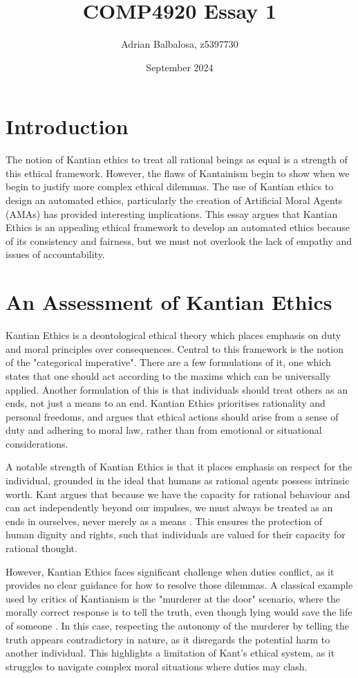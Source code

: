\documentclass{article}
\title{COMP4920 Essay 1}
\author{Adrian Balbalosa, z5397730}
\date{September 2024}
\begin{document}
\maketitle

\section{Introduction}
The notion of Kantian ethics to treat all rational beings as
equal is a strength of this ethical framework. However, the flaws of Kantainism 
begin to show when we begin to justify more complex ethical dilemmas. The 
use of Kantian ethics to design an automated ethics, particularly the creation of
Artificial Moral Agents (AMAs) has provided interesting implications. This essay
argues that Kantian Ethics is an appealing ethical framework to develop an automated 
ethics because of its consistency and fairness, but we must not overlook the lack of 
empathy and issues of accountability. 

\section{An Assessment of Kantian Ethics}
Kantian Ethics is a deontological ethical theory which places emphasis on duty and
moral principles over consequences. Central to this framework is the notion of the
"categorical imperative". There are a few formulations of it, one which states that one should act according to the maxims which
can be universally applied. Another formulation of this is that individuals should treat
others as an ends, not just a means to an end. Kantian Ethics prioritises rationality and
personal freedoms, and argues that ethical actions should arise from a sense of duty and
adhering to moral law, rather than from emotional or situational considerations.

A notable strength of Kantian Ethics is that it places emphasis on respect
for the individual, grounded in the ideal that humans as rational agents possess intrinsic worth. Kant 
argues that because we have the capacity for rational behaviour and can act independently beyond our
impulses, we must always be treated as an ends in ourselves, never merely as a means \parencite[p. 77]{bennet2015}. 
This ensures the protection of human dignity and rights, such that individuals are valued for their
capacity for rational thought.

However, Kantian Ethics faces significant challenge when duties conflict, as it provides
no clear guidance for how to resolve those dilemmas. A classical example used by
critics of Kantianism is the "murderer at the door" scenario, where the morally correct response is
to tell the truth, even though lying would save the life of someone \parencite[p. 81]{bennet2015}. In this case,
respecting the autonomy of the murderer by telling the truth appears contradictory in nature, as it 
disregards the potential harm to another individual. This highlights a limitation of Kant's ethical system,
as it struggles to navigate complex moral situations where duties may clash.
\end{document}
